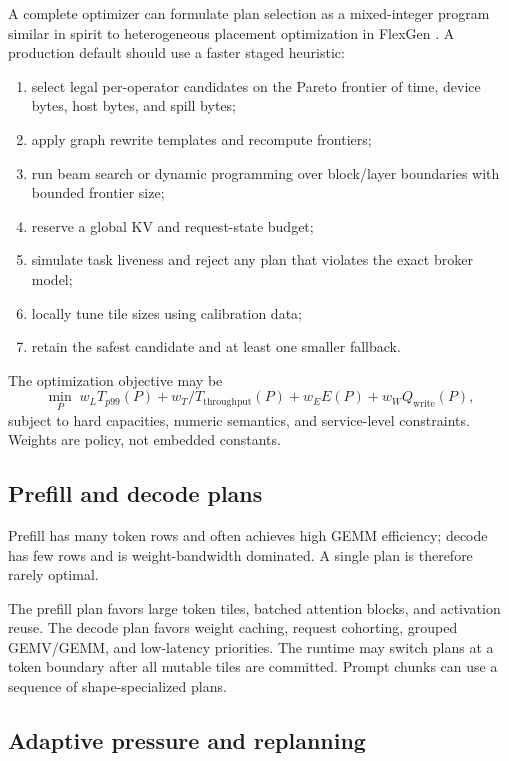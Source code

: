 A complete optimizer can formulate plan selection as a mixed-integer program similar in spirit to heterogeneous placement optimization in FlexGen \cite{sheng2023flexgen}. A production default should use a faster staged heuristic:

\begin{enumerate}
  \item select legal per-operator candidates on the Pareto frontier of time, device bytes, host bytes, and spill bytes;
  \item apply graph rewrite templates and recompute frontiers;
  \item run beam search or dynamic programming over block/layer boundaries with bounded frontier size;
  \item reserve a global KV and request-state budget;
  \item simulate task liveness and reject any plan that violates the exact broker model;
  \item locally tune tile sizes using calibration data;
  \item retain the safest candidate and at least one smaller fallback.
\end{enumerate}

The optimization objective may be
\[
  \min_P\; w_L T_{p99}(P)+w_T/T_{\mathrm{throughput}}(P)
  +w_EE(P)+w_WQ_{\mathrm{write}}(P),
\]
subject to hard capacities, numeric semantics, and service-level constraints. Weights are policy, not embedded constants.

\subsection{Prefill and decode plans}

Prefill has many token rows and often achieves high GEMM efficiency; decode has few rows and is weight-bandwidth dominated. A single plan is therefore rarely optimal.

The prefill plan favors large token tiles, batched attention blocks, and activation reuse. The decode plan favors weight caching, request cohorting, grouped GEMV/GEMM, and low-latency priorities. The runtime may switch plans at a token boundary after all mutable tiles are committed. Prompt chunks can use a sequence of shape-specialized plans.

\subsection{Adaptive pressure and replanning}

